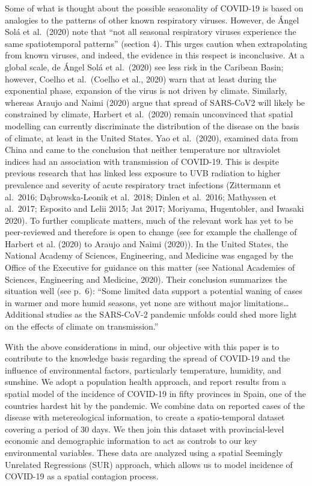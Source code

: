 \documentclass[]{elsarticle} %
\begin{document}
Some of what is thought about the possible seasonality of COVID-19 is
based on analogies to the patterns of other known respiratory viruses.
However, de Ángel Solá et al.~(2020) note that ``not all seasonal
respiratory viruses experience the same spatiotemporal patterns''
(section 4). This urges caution when extrapolating from known viruses,
and indeed, the evidence in this respect is inconclusive. At a global
scale, de Ángel Solá et al.~(2020) see less risk in the Caribean Basin;
however, Coelho et al.~(Coelho et al., 2020) warn that at least during
the exponential phase, expansion of the virus is not driven by climate.
Similarly, whereas Araujo and Naimi (2020) argue that spread of
SARS-CoV2 will likely be constrained by climate, Harbert et al.~(2020)
remain unconvinced that spatial modelling can currently discriminate the
distribution of the disease on the basis of climate, at least in the
United States. Yao et al.~(2020), examined data from China and came to
the conclusion that neither temperature nor ultraviolet indices had an
association with transmission of COVID-19. This is despite previous
research that has linked less exposure to UVB radiation to higher
prevalence and severity of acute respiratory tract infections
(Zittermann et al.~2016; Dąbrowska-Leonik et al.~2018; Dinlen et
al.~2016; Mathyssen et al.~2017; Esposito and Lelii 2015; Jat 2017;
Moriyama, Hugentobler, and Iwasaki 2020). To further complicate matters,
much of the relevant work has yet to be peer-reviewed and therefore is
open to change (see for example the challenge of Harbert et al. (2020)
to Araujo and Naimi (2020)). In the United States, the National Academy
of Sciences, Engineering, and Medicine was engaged by the Office of the
Executive for guidance on this matter (see National Academies of
Sciences, Engineering and Medicine, 2020). Their conclusion summarizes
the situation well (see p.~6): ``Some limited data support a potential
waning of cases in warmer and more humid seasons, yet none are without
major limitations\ldots Additional studies as the SARS-CoV-2 pandemic
unfolds could shed more light on the effects of climate on
transmission.''

With the above considerations in mind, our objective with this paper is
to contribute to the knowledge basis regarding the spread of COVID-19
and the influence of environmental factors, particularly temperature,
humidity, and sunshine. We adopt a population health approach, and
report results from a spatial model of the incidence of COVID-19 in
fifty provinces in Spain, one of the countries hardest hit by the
pandemic. We combine data on reported cases of the disease with
metereological information, to create a spatio-temporal dataset covering
a period of 30 days. We then join this dataset with provincial-level
economic and demographic information to act as controls to our key
environmental variables. These data are analyzed using a spatial
Seemingly Unrelated Regressions (SUR) approach, which allows us to model
incidence of COVID-19 as a spatial contagion process.
\end{document}
